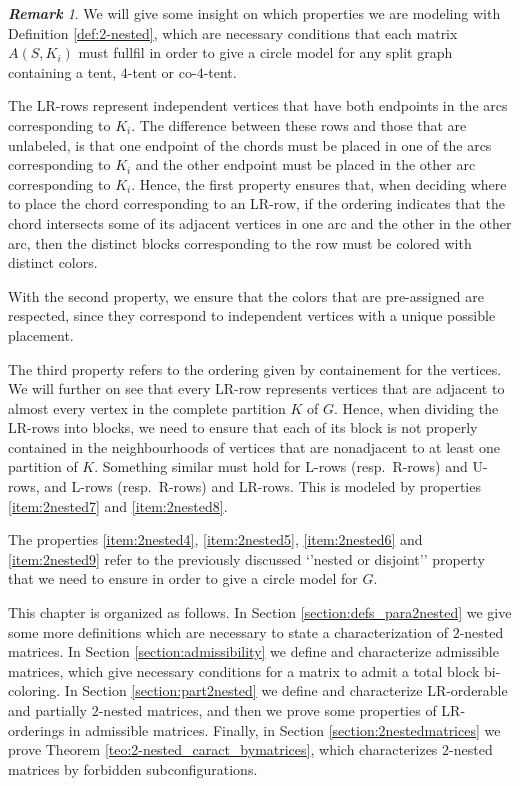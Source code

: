 \documentclass[12pt]{book}
\theoremstyle{plain}
\theoremstyle{remark}
\newtheorem{remark}[teo]{\textbf{\textit{Remark}}}
\begin{document}
\begin{remark}
We will give some insight on which properties we are modeling with Definition \ref{def:2-nested}, which are necessary conditions that each matrix $A(S,K_i)$ must fullfil in order to give a circle model for any split graph containing a tent, $4$-tent or co-$4$-tent.

The LR-rows represent independent vertices that have both endpoints in the arcs corresponding to $K_i$. The difference between these rows and those that are unlabeled, is that one endpoint of the chords must be placed in one of the arcs corresponding to $K_i$ and the other endpoint must be placed in the other arc corresponding to $K_i$. Hence, the first property ensures that, when deciding where to place the chord corresponding to an LR-row, if the ordering indicates that the chord intersects some of its adjacent vertices in one arc and the other in the other arc, then the distinct blocks corresponding to the row must be colored with distinct colors.

With the second property, we ensure that the colors that are pre-assigned are respected, since they correspond to independent vertices with a unique possible placement.

The third property refers to the ordering given by containement for the vertices. We will further on see that every LR-row represents vertices that are adjacent to almost every vertex in the complete partition $K$ of $G$. Hence, when dividing the LR-rows into blocks, we need to ensure that each of its block is not properly contained in the neighbourhoods of vertices that are nonadjacent to at least one partition of $K$. Something similar must hold for L-rows (resp.\ R-rows) and U-rows, and L-rows (resp.\ R-rows) and LR-rows. This is modeled by properties \ref{item:2nested7} and \ref{item:2nested8}.

The properties \ref{item:2nested4}, \ref{item:2nested5}, \ref{item:2nested6} and \ref{item:2nested9} refer to the previously discussed `'nested or disjoint'' property that we need to ensure in order to give a circle model for $G$.
\end{remark}


This chapter is organized as follows. In Section \ref{section:defs_para2nested} we give some more definitions which are necessary to state a characterization of $2$-nested matrices. In Section \ref{section:admissibility} we define and characterize admissible matrices, which give necessary conditions for a matrix to admit a total block bi-coloring. In Section \ref{section:part2nested} we define and characterize LR-orderable and partially $2$-nested matrices, and then we prove some properties of LR-orderings in admissible matrices. Finally, in Section \ref{section:2nestedmatrices} we prove Theorem \ref{teo:2-nested_caract_bymatrices}, which characterizes $2$-nested matrices by forbidden subconfigurations. 
\end{document}
